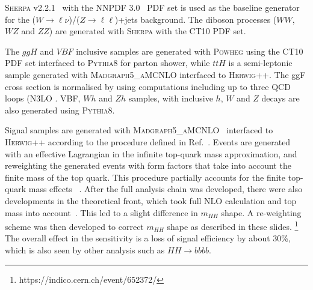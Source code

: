 \textsc{Sherpa} v2.2.1~\cite{Gleisberg:2008ta} with the
\textsc{NNPDF 3.0}~\cite{Lai:2010vv} PDF set is used as the baseline
generator for the ($W \to \ell\nu$)/($Z\to \ell\ell$)+jets background.
The diboson processes ($WW$,
$WZ$ and $ZZ$) are generated with \textsc{Sherpa} with the \textsc{CT10} PDF
set.  

The $ggH$ and $VBF$ inclusive samples are generated with \textsc{Powheg} using
the \textsc{CT10} PDF set interfaced to \textsc{Pythia8} for parton
shower, while $ttH$ is a semi-leptonic sample generated with
\textsc{Madgraph5\_aMC\at{}NLO} interfaced to \textsc{Herwig++}. The ggF cross
section is normalised by using computations including up to three QCD
loops (N3LO \cite{Anastasiou:2016cez}. VBF, $Wh$ and $Zh$ samples,
  with inclusive $h$, $W$ and $Z$ decays
are also generated using \textsc{Pythia8}. 


Signal samples are
generated with \textsc{Madgraph5\_aMC\at{}NLO}~\cite{Alwall:2014hca} interfaced to
\textsc{Herwig++} according to the procedure defined in Ref.~\cite{CP3Paper}. 
Events are generated with an effective
Lagrangian in the infinite top-quark mass approximation, and  reweighting the
generated events  with form factors that take into
account the finite mass of the top quark.  This procedure partially
accounts for the finite top-quark mass effects ~\cite{Degrassi_Ramona}. After the full analysis chain was developed, there were also developments in the theoretical front, which took full NLO calculation and top mass into account~\cite{Borowka:2016ypz, Borowka:2016ehy}. This led to a slight difference in $m_{HH}$ shape. A re-weighting scheme was then developed to correct $m_{HH}$ shape as described in these slides. {\footnote {https://indico.cern.ch/event/652372/}} The overall effect in the sensitivity is a loss of signal efficiency by about 30\%, which is also seen by other analysis such as $HH \rightarrow bbbb$. 

 
